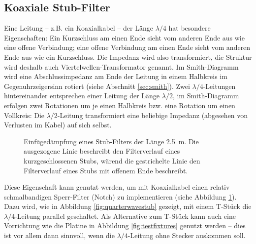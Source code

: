 \documentclass[twoside,a4paper,11pt,halfparskip,DIV=11,notitlepage]{scrartcl}
\begin{document}
\subsection{Koaxiale Stub-Filter}\label{sec:stubfilter}
Eine Leitung -- z.B. ein Koaxialkabel -- der Länge $\lambda/4$ hat besondere
Eigenschaften: Ein Kurzschluss am einen Ende sieht vom anderen Ende aus wie
eine offene Verbindung; eine offene Verbindung am einen Ende sieht vom anderen
Ende aus wie ein Kurzschluss. Die Impedanz wird also transformiert, die
Struktur wird deshalb auch Viertelwellen-Transformator genannt. Im Smith-Diagramm
wird eine Abschlussimpedanz am Ende der Leitung in einem Halbkreis im Gegenuhrzeigersinn
rotiert (siehe Abschnitt \ref{sec:smith}). Zwei $\lambda/4$-Leitungen
hintereinander entsprechen einer Leitung der Länge $\lambda/2$, im
Smith-Diagramm erfolgen zwei Rotationen um je einen Halbkreis bzw. eine
Rotation um einen Vollkreis: Die $\lambda/2$-Leitung transformiert eine
beliebige Impedanz (abgesehen von Verlusten im Kabel) auf sich selbst.

\begin{figure}[H]
\begin{center}
\end{center}
\caption{Einfügedämpfung eines Stub-Filters der Länge 2.5~m. Die ausgezogene Linie beschreibt den Filterverlauf
eines kurzgeschlossenen Stubs, wärend die gestrichelte Linie den Filterverlauf eines Stubs mit offenem Ende beschreibt.}
\label{fig:quarterwaveplot}
\end{figure}

Diese Eigenschaft kann genutzt werden, um mit Koaxialkabel einen relativ
schmalbandigen Sperr-Filter (Notch) zu implementieren (siehe Abbildung
\ref{fig:quarterwaveplot}). Dazu wird, wie in Abbildung
\ref{fig:quarterwavestub} gezeigt, mit einem T-Stück die $\lambda/4$-Leitung
parallel geschaltet. Als Alternative zum T-Stück kann auch eine Vorrichtung wie
die Platine in Abbildung \ref{fig:testfixtures} genutzt werden -- dies ist vor
allem dann sinnvoll, wenn die $\lambda/4$-Leitung ohne Stecker auskommen soll.
\end{document}
